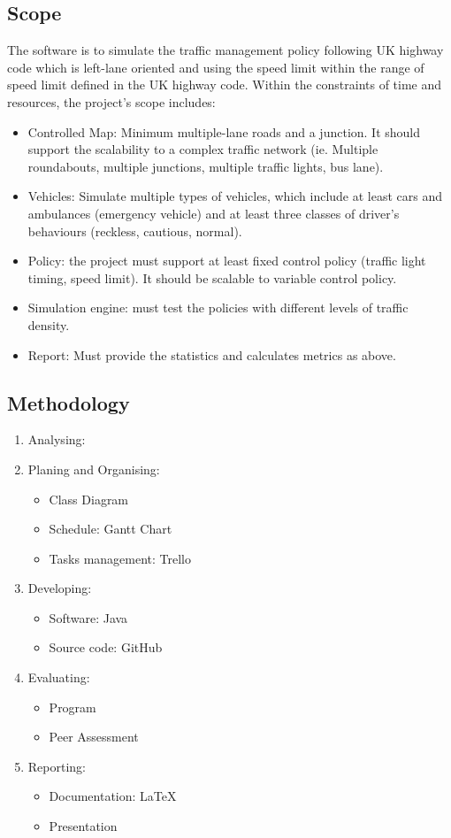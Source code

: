 \documentclass[11pt]{article}
\begin{document}
\subsection{Scope}
The software is to simulate the traffic management policy following UK highway code which is left-lane oriented and using the speed limit within the range of speed limit defined in the UK highway code.
Within the constraints of time and resources, the project's scope includes:
\begin{itemize}[noitemsep]
\item Controlled Map: Minimum multiple-lane roads and a junction. It should support the scalability to a complex traffic network (ie. Multiple roundabouts, multiple junctions, multiple traffic lights, bus lane).
\item Vehicles: Simulate multiple types of vehicles, which include at least cars and ambulances (emergency vehicle) and at least three classes of driver’s behaviours (reckless, cautious, normal).
\item Policy: the project must support at least fixed control policy (traffic light timing, speed limit). It should be scalable to variable control policy.
\item Simulation engine: must test the policies with different levels of traffic density.
\item Report: Must provide the statistics and calculates metrics as above.
\end{itemize}

	
\subsection{Methodology}
\begin{enumerate}
\item Analysing: 
\item Planing and Organising:
    \begin{itemize}[noitemsep]
	\item Class Diagram
	\item Schedule: Gantt Chart
	\item Tasks management: Trello
	\end{itemize}
\item Developing:
	\begin{itemize}[noitemsep]
	\item Software: Java
	\item Source code: GitHub
	\end{itemize}
\item 	Evaluating:
	\begin{itemize}[noitemsep]
	\item Program
	\item Peer Assessment
	\end{itemize}
\item  	Reporting:
	\begin{itemize}[noitemsep]
	\item Documentation: LaTeX
	\item Presentation
	\end{itemize}
\end{enumerate}
\end{document}
